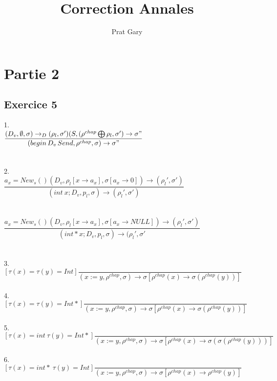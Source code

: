 \documentclass[10pt,a4paper]{article}
\author{Prat Gary}
\title{Correction Annales}
\begin{document}
\maketitle
\section{Partie 2}
\subsection{Exercice 5}
1.\\
 $\dfrac{(D_{v},\emptyset,\sigma)\rightarrow _{D} (\rho_{l},\sigma')  (S,(\rho^{chap}\bigoplus\rho_{l},\sigma')\rightarrow\sigma" }
 {(begin \,  D_{v} \, S end,\rho^{chap},\sigma) \rightarrow \sigma"}$
 \\\\
 \\
 2.\\
$ \dfrac{a_x = New_s() (D_v,\rho_l[x \rightarrow a_x],\sigma[a_x \rightarrow 0])\rightarrow(\rho_l ',\sigma')}
{(int~x;D_v,p_l,\sigma) \rightarrow(\rho_l ',\sigma')}$
\\\\\\
$ \dfrac{a_x = New_s() (D_v,\rho_l[x \rightarrow a_x],\sigma[a_x \rightarrow NULL])\rightarrow(\rho_l ',\sigma')}
{(int* x;D_v,p_l,\sigma) \rightarrow(\rho_l ',\sigma'}$
\\
\\
\\
3.\\
$[\tau(x)=\tau(y)=Int ]\dfrac{ }{(x:=y,\rho^{chap},\sigma) \rightarrow \sigma [\rho^{chap}(x) \rightarrow \sigma(\rho^{chap}(y))]}$
\\
\\
4.\\
$[\tau(x)=\tau(y)=Int* ]\dfrac{ }{(x:=y,\rho^{chap},\sigma) \rightarrow \sigma [\rho^{chap}(x) \rightarrow
 \sigma(\rho^{chap}(y))]}$
\\
\\
5.\\
$[\tau(x)= int ~\tau(y)=Int* ]\dfrac{ }{(x:=y,\rho^{chap},\sigma) \rightarrow \sigma [\rho^{chap}(x) \rightarrow
\sigma( \sigma(\rho^{chap}(y)))]}$
\\
\\
6.\\
$[\tau(x)= int* ~\tau(y)=Int ]\dfrac{ }{(x:=y,\rho^{chap},\sigma) \rightarrow \sigma [\rho^{chap}(x) \rightarrow
\rho^{chap}(y)]}$
\\
\\
\end{document}
